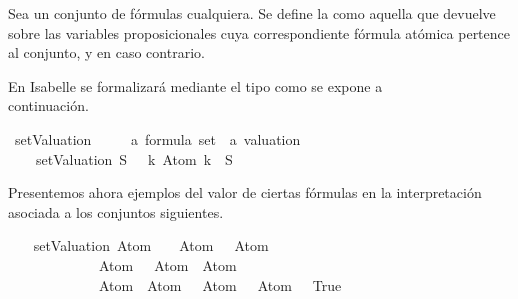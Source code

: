 \begin{isabellebody}
\begin{isamarkuptext}
  \begin{definicion}
    Sea un conjunto de fórmulas cualquiera. Se define la  como aquella que devuelve  sobre 
    las variables proposicionales cuya correspondiente fórmula 
    atómica pertence al conjunto, y  en caso contrario.
  \end{definicion}

  En Isabelle se formalizará mediante el tipo  como se
  expone a\\ continuación.%
\end{isamarkuptext}\isamarkuptrue%
\isamarkupfalse%
\ setValuation\ {\isacharcolon}{\isacharcolon}\ \isanewline
\ \ \ {\isachardoublequoteopen}{\isacharparenleft}{\isacharprime}a\ formula{\isacharparenright}\ set\ {\isasymRightarrow}\ {\isacharprime}a\ valuation{\isachardoublequoteclose}\ \isanewline
\ \ \ \ {\isachardoublequoteopen}setValuation\ S\ \ {\isasymequiv}\ {\isasymlambda}k{\isachardot}\ Atom\ k\ {\isasymin}\ S{\isachardoublequoteclose}%
\begin{isamarkuptext}%
Presentemos ahora ejemplos del valor de ciertas fórmulas 
  en la interpretación asociada a los conjuntos siguientes.%
\end{isamarkuptext}\isamarkuptrue%
\isamarkupfalse%
\isanewline
{}\isanewline
%
\isadelimproof
\isanewline
\ \ %
\endisadelimproof
%
\isatagproof
{}\isamarkupfalse%
\ {\isachardoublequoteopen}{\isacharparenleft}setValuation\ {\isacharbraceleft}Atom\ {}\ \isactrlbold {\isasymand}\ {\isacharparenleft}{\isacharparenleft}\isactrlbold {\isasymnot}\ {\isacharparenleft}Atom\ {}{\isacharparenright}{\isacharparenright}\ \isactrlbold {\isasymrightarrow}\ Atom\ {}{\isacharparenright}{\isacharcomma}\ \isanewline
\ \ \ \ \ \ \ \ \ \ \ \ {\isacharparenleft}{\isacharparenleft}\isactrlbold {\isasymnot}\ {\isacharparenleft}Atom\ {}{\isacharparenright}{\isacharparenright}\ \isactrlbold {\isasymrightarrow}\ Atom\ {}{\isacharparenright}{\isacharcomma}\ Atom\ {}{\isacharcomma}\isanewline
\ \ \ \ \ \ \ \ \ \ \ \ \isactrlbold {\isasymnot}{\isacharparenleft}\isactrlbold {\isasymnot}\ {\isacharparenleft}Atom\ {}{\isacharparenright}{\isacharparenright}{\isacharcomma}\ Atom\ {}{\isacharbraceright}{\isacharparenright}\ {\isasymTurnstile}\ Atom\ {}\ \isactrlbold {\isasymrightarrow}\ Atom\ {}\ {\isacharequal}\ True{\isachardoublequoteclose}\isanewline

\end{isabellebody}
